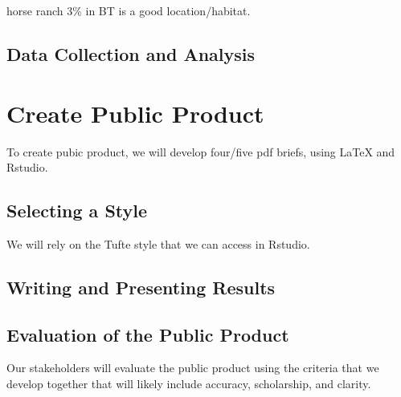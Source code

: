 \documentclass{article}\usepackage[]{graphicx}\usepackage[]{color}
\begin{document}
horse ranch 3\% in BT is a good location/habitat.


\subsection{Data Collection and Analysis}

\section{Create Public Product}

To create pubic product, we will develop four/five pdf briefs, using LaTeX and Rstudio. 

\subsection{Selecting a Style}

We will rely on the Tufte style that we can access in Rstudio. 

\subsection{Writing and Presenting Results}

\subsection{Evaluation of the Public Product}

Our stakeholders will evaluate the public product using the criteria that we develop together that will likely include accuracy, scholarship, and clarity. 
\end{document}
